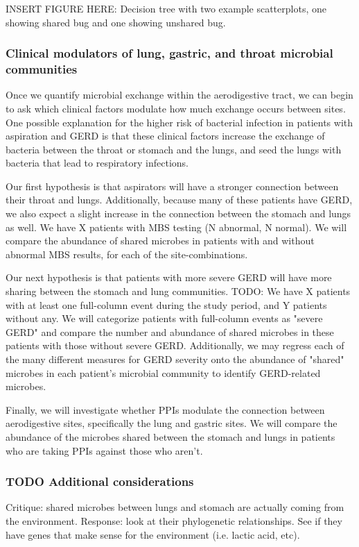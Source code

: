 \documentclass[12pt]{article}
\begin{document}
INSERT FIGURE HERE: Decision tree with two example scatterplots, one showing shared bug and one showing unshared bug.

\subsubsection{Clinical modulators of lung, gastric, and throat microbial communities}
Once we quantify microbial exchange within the aerodigestive tract, we can begin to ask which clinical factors modulate how much exchange occurs between sites. One possible explanation for the higher risk of bacterial infection in patients with aspiration and GERD is that these clinical factors increase the exchange of bacteria between the throat or stomach and the lungs, and seed the lungs with bacteria that lead to respiratory infections.

Our first hypothesis is that aspirators will have a stronger connection between their throat and lungs. Additionally, because many of these patients have GERD, we also expect a slight increase in the connection between the stomach and lungs as well. We have X patients with MBS testing (N abnormal, N normal). We will compare the abundance of shared microbes in patients with and without abnormal MBS results, for each of the site-combinations. 

Our next hypothesis is that patients with more severe GERD will have more sharing between the stomach and lung communities. TODO: We have X patients with at least one full-column event during the study period, and Y patients without any. We will categorize patients with full-column events as "severe GERD" and compare the number and abundance of shared microbes in these patients with those without severe GERD. Additionally, we may regress each of the many different measures for GERD severity onto the abundance of "shared" microbes in each patient's microbial community to identify GERD-related microbes.

Finally, we will investigate whether PPIs modulate the connection between aerodigestive sites, specifically the lung and gastric sites. We will compare the abundance of the microbes shared between the stomach and lungs in patients who are taking PPIs against those who aren't. 

\subsubsection{TODO Additional considerations}
Critique: shared microbes between lungs and stomach are actually coming from the environment. Response: look at their phylogenetic relationships. See if they have genes that make sense for the environment (i.e. lactic acid, etc).
\end{document}
